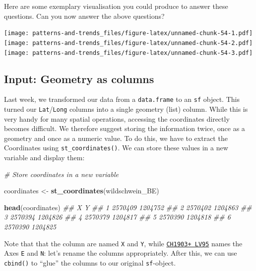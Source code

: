 \documentclass[]{book}
\newenvironment{Shaded}{\begin{snugshade}}{\end{snugshade}}
\newcommand{\CommentTok}[1]{\textcolor[rgb]{0.56,0.35,0.01}{\textit{#1}}}
\newcommand{\KeywordTok}[1]{\textcolor[rgb]{0.13,0.29,0.53}{\textbf{#1}}}
\newcommand{\NormalTok}[1]{#1}
\newcommand{\StringTok}[1]{\textcolor[rgb]{0.31,0.60,0.02}{#1}}
\begin{document}
Here are some exemplary visualisation you could produce to answer these questions. Can you now answer the above questions?

\texttt{[image: patterns-and-trends\_files/figure-latex/unnamed-chunk-54-1.pdf]} \texttt{[image: patterns-and-trends\_files/figure-latex/unnamed-chunk-54-2.pdf]} \texttt{[image: patterns-and-trends\_files/figure-latex/unnamed-chunk-54-3.pdf]}

\hypertarget{input-geometry-as-columns}{%
\subsection{Input: Geometry as columns}\label{input-geometry-as-columns}}

Last week, we transformed our data from a \texttt{data.frame} to an \texttt{sf} object. This turned our \texttt{Lat}/\texttt{Long} columns into a single geometry (list) column. While this is very handy for many spatial operations, accessing the coordinates directly becomes difficult. We therefore suggest storing the information twice, once as a geometry and once as a numeric value. To do this, we have to extract the Coordinates using \texttt{st\_coordinates()}. We can store these values in a new variable and display them:

\begin{Shaded}
\begin{Highlighting}[]
\CommentTok{# Store coordinates in a new variable}

\NormalTok{coordinates <-}\StringTok{ }\KeywordTok{st_coordinates}\NormalTok{(wildschwein_BE)}

\KeywordTok{head}\NormalTok{(coordinates)}
\CommentTok{##         X       Y}
\CommentTok{## 1 2570409 1204752}
\CommentTok{## 2 2570402 1204863}
\CommentTok{## 3 2570394 1204826}
\CommentTok{## 4 2570379 1204817}
\CommentTok{## 5 2570390 1204818}
\CommentTok{## 6 2570390 1204825}
\end{Highlighting}
\end{Shaded}

Note that that the column are named \texttt{X} and \texttt{Y}, while \href{https://www.swisstopo.admin.ch/de/wissen-fakten/geodaesie-vermessung/neue-koordinaten.html}{\texttt{CH1903+\ LV95}} names the Axes \texttt{E} and \texttt{N}: let's rename the columns appropriately. After this, we can use \texttt{cbind()} to ``glue'' the columns to our original \texttt{sf}-object.
\end{document}
